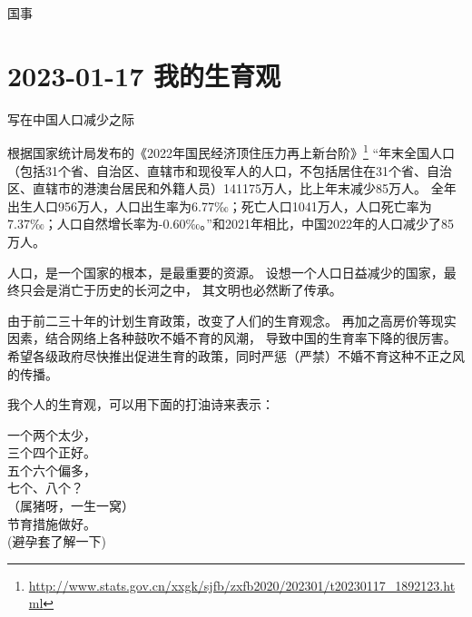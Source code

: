 \begin{taged}{国事}
\section{2023-01-17 我的生育观}
\begin{center}
    写在中国人口减少之际
\end{center}
\end{taged}

根据国家统计局发布的《2022年国民经济顶住压力再上新台阶》\footnote{\url{http://www.stats.gov.cn/xxgk/sjfb/zxfb2020/202301/t20230117_1892123.html}}
“年末全国人口（包括31个省、自治区、直辖市和现役军人的人口，不包括居住在31个省、自治区、直辖市的港澳台居民和外籍人员）141175万人，比上年末减少85万人。
全年出生人口956万人，人口出生率为6.77‰；死亡人口1041万人，人口死亡率为7.37‰；人口自然增长率为-0.60‰。”和2021年相比，中国2022年的人口减少了85万人。

人口，是一个国家的根本，是最重要的资源。
设想一个人口日益减少的国家，最终只会是消亡于历史的长河之中，
其文明也必然断了传承。

由于前二三十年的计划生育政策，改变了人们的生育观念。
再加之高房价等现实因素，结合网络上各种鼓吹不婚不育的风潮，
导致中国的生育率下降的很厉害。
希望各级政府尽快推出促进生育的政策，同时严惩（严禁）不婚不育这种不正之风的传播。

\contentsep

我个人的生育观，可以用下面的打油诗来表示：

\begin{shici}
    一个两个太少，\\
    三个四个正好。\\
    五个六个偏多，\\
    七个、八个？\\
    （属猪呀，一生一窝）\\
    节育措施做好。\\
    (避孕套了解一下)
\end{shici}

